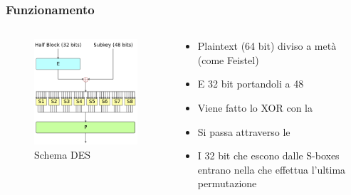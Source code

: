 		\begin{frame}
			\frametitle{Funzionamento}	
			\begin{columns}
				\begin{column}{0.4\textwidth}
					\begin{center}
						\begin{figure}
							\includegraphics[width=\columnwidth]{img/des}
							\caption{Schema DES}
						\end{figure}
					\end{center}
				\end{column}
				\begin{column}{0.55\textwidth}
					\begin{itemize}
						\item Plaintext (64 bit) diviso a metà (come Feistel)
						\item E  32 bit portandoli a 48
						\item Viene fatto lo XOR con la 
						\item Si passa attraverso le 
						\item I 32 bit che escono dalle S-boxes entrano nella  che effettua l'ultima permutazione
					\end{itemize}
				\end{column}		
			\end{columns}		
		\end{frame}
	
